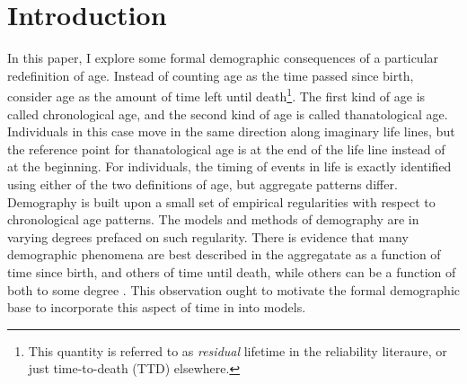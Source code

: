 \documentclass{article}
\begin{document}
\section*{Introduction}
In this paper, I explore some formal demographic consequences of a particular redefinition of age. Instead of counting age as the time passed since birth, consider age as the amount of time left until death\footnote{This quantity is referred to as \textit{residual} lifetime
in the reliability literaure, or just time-to-death (TTD) elsewhere.}. The first
kind of age is called chronological age, and the second kind of age is called
thanatological age. Individuals in this case move in the same direction along
imaginary life lines, but the reference point for thanatological age is at
the end of the life line instead of at the beginning. For individuals, the timing of events in life is exactly identified using either of the two definitions of age, but
aggregate patterns differ. Demography is built upon a small set of empirical
regularities with respect to chronological age patterns. The models and methods
of demography are in varying degrees prefaced on such regularity. There is evidence that many demographic phenomena are best described in the
aggregatate as a function of time since birth, and others of time until death,
while others can be a function of both to some degree
\citep{riffe2015ttd}. This observation ought to motivate the formal demographic
base to incorporate this aspect of time in into models. 
\end{document}
